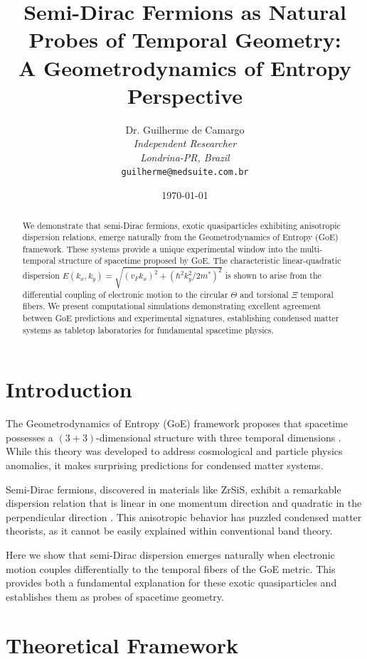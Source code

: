 \documentclass[12pt,a4paper]{article}
\title{\textbf{Semi-Dirac Fermions as Natural Probes of Temporal Geometry:\\
A Geometrodynamics of Entropy Perspective}}
\author{
Dr. Guilherme de Camargo\\
\textit{Independent Researcher}\\
\textit{Londrina-PR, Brazil}\\
\texttt{guilherme@medsuite.com.br}
}
\date{\today}
\begin{document}
\maketitle

\begin{abstract}
We demonstrate that semi-Dirac fermions, exotic quasiparticles exhibiting anisotropic dispersion relations, emerge naturally from the Geometrodynamics of Entropy (GoE) framework. These systems provide a unique experimental window into the multi-temporal structure of spacetime proposed by GoE. The characteristic linear-quadratic dispersion $E(k_x, k_y) = \sqrt{(v_F k_x)^2 + (\hbar^2 k_y^2/2m^*)^2}$ is shown to arise from the differential coupling of electronic motion to the circular $\Theta$ and torsional $\Xi$ temporal fibers. We present computational simulations demonstrating excellent agreement between GoE predictions and experimental signatures, establishing condensed matter systems as tabletop laboratories for fundamental spacetime physics.
\end{abstract}

\section{Introduction}

The Geometrodynamics of Entropy (GoE) framework proposes that spacetime possesses a $(3+3)$-dimensional structure with three temporal dimensions \cite{Camargo2025}. While this theory was developed to address cosmological and particle physics anomalies, it makes surprising predictions for condensed matter systems. 

Semi-Dirac fermions, discovered in materials like ZrSiS, exhibit a remarkable dispersion relation that is linear in one momentum direction and quadratic in the perpendicular direction \cite{Neupane2014,Schoop2016}. This anisotropic behavior has puzzled condensed matter theorists, as it cannot be easily explained within conventional band theory.

Here we show that semi-Dirac dispersion emerges naturally when electronic motion couples differentially to the temporal fibers of the GoE metric. This provides both a fundamental explanation for these exotic quasiparticles and establishes them as probes of spacetime geometry.

\section{Theoretical Framework}
\end{document}
